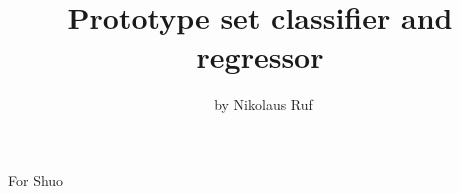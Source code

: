 \documentclass[a4paper, 11pt, openany]{book}
\title{\Huge\textbf{Prototype set classifier and regressor}}
\author{\Large\textcopyright\ by Nikolaus Ruf}
\date{}
\newcommand*{\1}{\ensuremath{\mathbb{1}}}
\begin{document}
\maketitle
%
\pagestyle{empty}
\begin{center}
\vspace*{2in}
\Large For Shuo
\end{center}
\newpage
\pagestyle{plain}
%
\frontmatter
\tableofcontents

%
\mainmatter




%
\appendix

\end{document}
